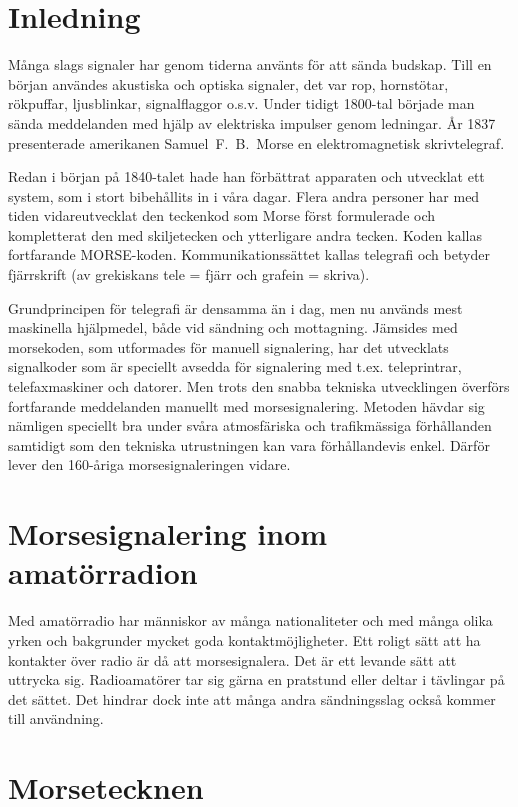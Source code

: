 \section{Inledning}

Många slags signaler har genom tiderna använts för att sända budskap. Till en
början användes akustiska och optiska signaler, det var rop, hornstötar,
rökpuffar, ljusblinkar, signalflaggor o.s.v. Under tidigt 1800-tal började man
sända meddelanden med hjälp av elektriska impulser genom ledningar. År 1837
presenterade amerikanen Samuel~F.~B.~Morse en elektromagnetisk skrivtelegraf.

Redan i början på 1840-talet hade han förbättrat apparaten och utvecklat ett
system, som i stort bibehållits in i våra dagar. Flera andra personer har med
tiden vidareutvecklat den teckenkod som Morse först formulerade och kompletterat
den med skiljetecken och ytterligare andra tecken. Koden kallas fortfarande
MORSE-koden. Kommunikationssättet kallas telegrafi och betyder fjärrskrift (av
grekiskans tele = fjärr och grafein = skriva).

Grundprincipen för telegrafi är densamma än i dag, men nu används mest
maskinella hjälpmedel, både vid sändning och mottagning. Jämsides med
morsekoden, som utformades för manuell signalering, har det utvecklats
signalkoder som är speciellt avsedda för signalering med t.ex. teleprintrar,
telefaxmaskiner och datorer. Men trots den snabba tekniska utvecklingen överförs
fortfarande meddelanden manuellt med morsesignalering. Metoden hävdar sig
nämligen speciellt bra under svåra atmosfäriska och trafikmässiga förhållanden
samtidigt som den tekniska utrustningen kan vara förhållandevis enkel. Därför
lever den 160-åriga morsesignaleringen vidare.

\section{Morsesignalering inom amatörradion}

Med amatörradio har människor av många nationaliteter och med många olika yrken
och bakgrunder mycket goda kontaktmöjligheter. Ett roligt sätt att ha kontakter
över radio är då att morsesignalera. Det är ett levande sätt att uttrycka sig.
Radioamatörer tar sig gärna en pratstund eller deltar i tävlingar på det sättet.
Det hindrar dock inte att många andra sändningsslag också kommer till
användning.

\section{Morsetecknen}

